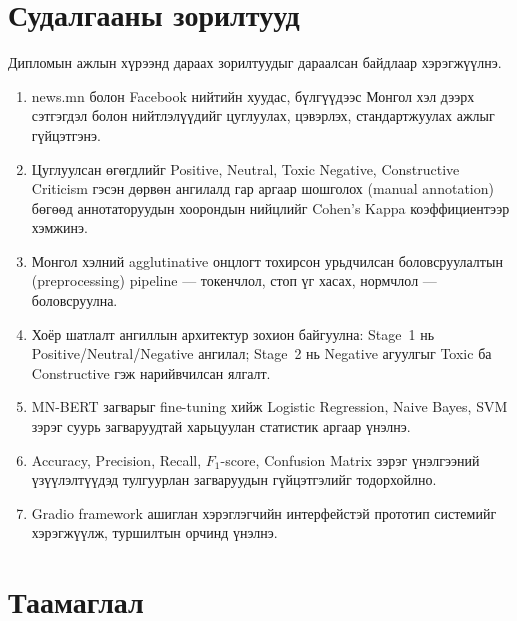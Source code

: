 \section{Судалгааны зорилтууд}

Дипломын ажлын хүрээнд дараах зорилтуудыг дараалсан байдлаар хэрэгжүүлнэ.

\begin{enumerate}
  \item news.mn болон Facebook нийтийн хуудас, бүлгүүдээс Монгол хэл дээрх
        сэтгэгдэл болон нийтлэлүүдийг цуглуулах, цэвэрлэх, стандартжуулах
        ажлыг гүйцэтгэнэ.

  \item Цуглуулсан өгөгдлийг Positive, Neutral, Toxic Negative, Constructive
        Criticism гэсэн дөрвөн ангилалд гар аргаар шошголох (manual
        annotation) бөгөөд аннотаторуудын хоорондын нийцлийг Cohen's Kappa
        коэффициентээр хэмжинэ.

  \item Монгол хэлний agglutinative онцлогт тохирсон урьдчилсан боловсруулалтын
        (preprocessing) pipeline --- токенчлол, стоп үг хасах, нормчлол ---
        боловсруулна.

  \item Хоёр шатлалт ангиллын архитектур зохион байгуулна: Stage~1 нь
        Positive/Neutral/Negative ангилал; Stage~2 нь Negative агуулгыг Toxic
        ба Constructive гэж нарийвчилсан ялгалт.

  \item MN-BERT загварыг fine-tuning хийж Logistic Regression, Naive Bayes,
        SVM зэрэг суурь загваруудтай харьцуулан статистик аргаар үнэлнэ.

  \item Accuracy, Precision, Recall, $F_1$-score, Confusion Matrix зэрэг
        үнэлгээний үзүүлэлтүүдэд тулгуурлан загваруудын гүйцэтгэлийг
        тодорхойлно.

  \item Gradio framework ашиглан хэрэглэгчийн интерфейстэй прототип
        системийг хэрэгжүүлж, туршилтын орчинд үнэлнэ.
\end{enumerate}

\section{Таамаглал}

